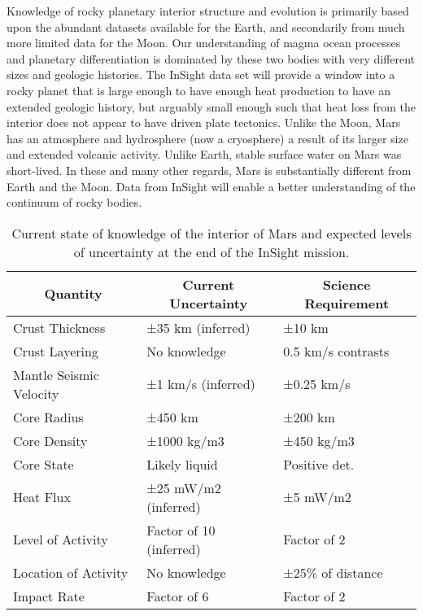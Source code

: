 Knowledge of rocky planetary interior structure and evolution is primarily based upon the abundant datasets available for the Earth, and secondarily from much more limited data for the Moon.  Our understanding of magma ocean processes and planetary differentiation is dominated by these two bodies with very different sizes and geologic histories.   The InSight data set will provide a window into a rocky planet that is large enough to have enough heat production to have an extended geologic history, but arguably small enough such that heat loss from the interior does not appear to have driven plate tectonics.  Unlike the Moon, Mars has an atmosphere and hydrosphere (now a cryosphere) a result of its larger size and extended volcanic activity.  Unlike Earth, stable surface water on Mars was short-lived.  In these and many other regards, Mars is substantially different from Earth and the Moon.  Data from InSight will enable a better understanding of the continuum of rocky bodies.




\begin{table}[h!]
\centering
\caption{Current state of knowledge of the interior of Mars and expected levels of uncertainty at the end of the InSight mission.}
\begin{tabular}{|l|l|l|}
\hline
\multicolumn{1}{|c|}{\textbf{Quantity}} & \multicolumn{1}{c|}{\textbf{Current Uncertainty}} & \multicolumn{1}{c|}{\textbf{Science Requirement}} \\ \hline
Crust Thickness                & ±35 km (inferred)                        & ±10 km                                   \\ \hline
Crust Layering                 & No knowledge                             & 0.5 km/s contrasts                       \\ \hline
Mantle Seismic Velocity        & ±1 km/s (inferred)                       & ±0.25 km/s                               \\ \hline
Core Radius                    & ±450 km                                  & ±200 km                                  \\ \hline
Core Density                   & ±1000 kg/m3                              & ±450 kg/m3                               \\ \hline
Core State                     & Likely liquid                            & Positive det.                            \\ \hline
Heat Flux                      & ±25 mW/m2 (inferred)                     & ±5 mW/m2                                 \\ \hline
Level of Activity              & Factor of 10 (inferred)                  & Factor of 2                              \\ \hline
Location of Activity           & No knowledge                             & ±25\% of distance                        \\ \hline
Impact Rate                    & Factor of 6                              & Factor of 2                              \\ \hline
\end{tabular}
\label{tab:uncertainty}
\end{table}


